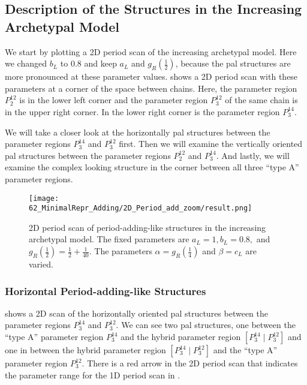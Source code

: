 \subsection{Description of the Structures in the Increasing Archetypal Model}
\label{sec:add.add.like}

We start by plotting a 2D period scan of the increasing archetypal model.
Here we changed $b_L$ to $0.8$ and keep $a_L$ and $g_R\left(\frac{1}{2}\right)$, because the \gls{pal} structures are more pronounced at these parameter values.
 shows a 2D period scan with these parameters at a corner of the space between chains.
Here, the parameter region $P^{12}_2$ is in the lower left corner and the parameter region $P^{12}_3$ of the same chain is in the upper right corner.
In the lower right corner is the parameter region $P^{14}_3$.

We will take a closer look at the horizontally \gls{pal} structures between the parameter regions $P^{14}_3$ and $P^{12}_3$ first.
Then we will examine the vertically oriented \gls{pal} structures between the parameter regions $P^{12}_2$ and $P^{14}_3$.
And lastly, we will examine the complex looking structure in the corner between all three ``type A'' parameter regions.

\begin{figure}
	\centering
	\texttt{[image: 62\_MinimalRepr\_Adding/2D\_Period\_add\_zoom/result.png]}
	\caption[2D period scan of period-adding-like structures in the increasing archetypal model]{
		2D period scan of period-adding-like structures in the increasing archetypal model.
		The fixed parameters are $a_L = 1, b_L = 0.8,$ and $g_R\left(\frac{1}{2}\right) = \frac{1}{2} + \frac{1}{40}$.
		The parameters $\alpha = g_R\left(\frac{1}{4}\right)$ and $\beta = c_L$ are varied.
	}
	\label{fig:add.add.like}
\end{figure}

\subsubsection{Horizontal Period-adding-like Structures}

 shows a 2D scan of the horizontally oriented \gls{pal} structures between the parameter regions $P^{14}_3$ and $P^{12}_3$.
We can see two \gls{pal} structures, one between the ``type A'' parameter region $P^{14}_3$ and the hybrid parameter region $\left[P^{14}_3 \mid P^{12}_3\right]$ and one in between the hybrid parameter region $\left[P^{14}_3 \mid P^{12}_3\right]$ and the ``type A'' parameter region $P^{12}_3$.
There is a red arrow in the 2D period scan that indicates the parameter range for the 1D period scan in .

